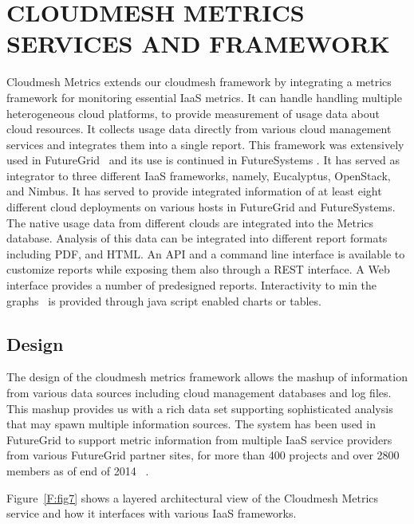 \documentclass{sig-alternate-05-2015}
\begin{document}
\section{CLOUDMESH METRICS SERVICES AND FRAMEWORK}\label{S:cloudmesh}

Cloudmesh Metrics extends our cloudmesh framework \cite{las14cloudmeshmultiple} by integrating a metrics framework for monitoring essential IaaS metrics. It can handle handling multiple heterogeneous cloud platforms, to provide measurement of usage data about cloud resources.  It collects usage data directly from various cloud management services and integrates them into a single report. This framework was extensively used in FutureGrid~\cite{las2010gce,las12fg-bookchapter} and its use is continued in FutureSystems \cite{??}. It has served as integrator to three different IaaS frameworks, namely, Eucalyptus, OpenStack, and Nimbus. It has served to provide integrated information of at least eight different cloud deployments on various hosts in FutureGrid and FutureSystems.  The native usage data from different clouds are integrated into the Metrics database. Analysis of this data can be integrated into different report formats including PDF, and HTML. An API and a command line interface is available to customize reports while exposing them also through a REST interface. A Web interface provides a number of predesigned reports. Interactivity to min the graphs~\cite{highsoft2012highcharts} is provided through java script enabled charts or tables.

\subsection{Design}

The design of the cloudmesh metrics framework allows the mashup of information from various data sources including cloud management databases and log files. This mashup provides us with a rich data set supporting sophisticated analysis that may spawn multiple information sources.  The system has been used in FutureGrid to support metric information from multiple IaaS service providers from various FutureGrid partner sites, for more than 400 projects and over 2800 members as of end of 2014 ~\cite{las14cloudmeshmultiple}.

Figure~\ref{F:fig7} shows a layered architectural view of the Cloudmesh Metrics service and how it interfaces with various IaaS frameworks.
\end{document}
